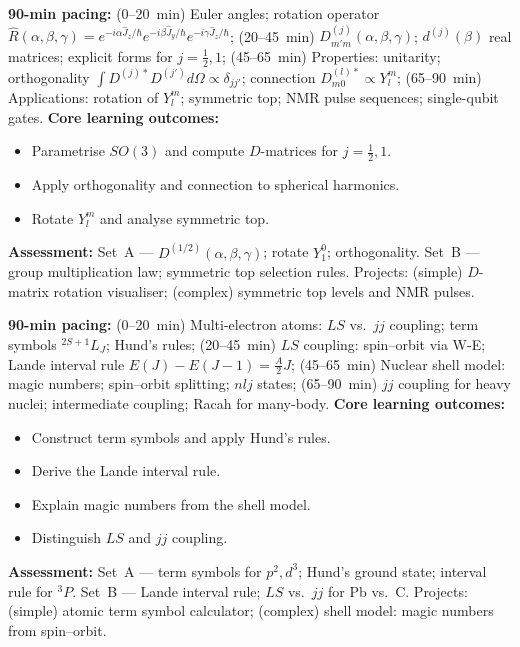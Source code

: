 \documentclass[11pt,a4paper]{article}
\begin{document}
\medskip

\begin{tcolorbox}[modulebox, title={Module~II.3 --- Lecture L10: Wigner $D$-matrices}]
\textbf{90-min pacing:} (0--20~min) Euler angles; rotation operator $\hat{R}(\alpha,\beta,\gamma)=e^{-i\alpha\hat{J}_z/\hbar}e^{-i\beta\hat{J}_y/\hbar}e^{-i\gamma\hat{J}_z/\hbar}$; (20--45~min) $D^{(j)}_{m'm}(\alpha,\beta,\gamma)$; $d^{(j)}(\beta)$ real matrices; explicit forms for $j=\tfrac{1}{2},1$; (45--65~min) Properties: unitarity; orthogonality $\int D^{(j)*}D^{(j')}d\Omega\propto\delta_{jj'}$; connection $D^{(l)*}_{m0}\propto Y_l^m$; (65--90~min) Applications: rotation of $Y_l^m$; symmetric top; NMR pulse sequences; single-qubit gates.
\medskip\textbf{Core learning outcomes:}
\begin{itemize}[leftmargin=1.4em,topsep=2pt,itemsep=1pt]
  \item Parametrise $SO(3)$ and compute $D$-matrices for $j=\tfrac{1}{2},1$.
  \item Apply orthogonality and connection to spherical harmonics.
  \item Rotate $Y_l^m$ and analyse symmetric top.
\end{itemize}
\medskip\textbf{Assessment:}
Set~A --- $D^{(1/2)}(\alpha,\beta,\gamma)$; rotate $Y_1^0$; orthogonality.
Set~B --- group multiplication law; symmetric top selection rules.
Projects: (simple) $D$-matrix rotation visualiser; (complex) symmetric top levels and NMR pulses.
\end{tcolorbox}

\medskip

\begin{tcolorbox}[modulebox, title={Module~II.3 --- Lecture L11: Angular Momentum in Many-Body Systems}]
\textbf{90-min pacing:} (0--20~min) Multi-electron atoms: $LS$ vs.\ $jj$ coupling; term symbols $^{2S+1}L_J$; Hund's rules; (20--45~min) $LS$ coupling: spin--orbit via W-E; Lande interval rule $E(J)-E(J-1)=\tfrac{A}{2}J$; (45--65~min) Nuclear shell model: magic numbers; spin--orbit splitting; $nlj$ states; (65--90~min) $jj$ coupling for heavy nuclei; intermediate coupling; Racah for many-body.
\medskip\textbf{Core learning outcomes:}
\begin{itemize}[leftmargin=1.4em,topsep=2pt,itemsep=1pt]
  \item Construct term symbols and apply Hund's rules.
  \item Derive the Lande interval rule.
  \item Explain magic numbers from the shell model.
  \item Distinguish $LS$ and $jj$ coupling.
\end{itemize}
\medskip\textbf{Assessment:}
Set~A --- term symbols for $p^2,d^3$; Hund's ground state; interval rule for $^3P$.
Set~B --- Lande interval rule; $LS$ vs.\ $jj$ for Pb vs.\ C.
Projects: (simple) atomic term symbol calculator; (complex) shell model: magic numbers from spin--orbit.
\end{tcolorbox}
\end{document}
